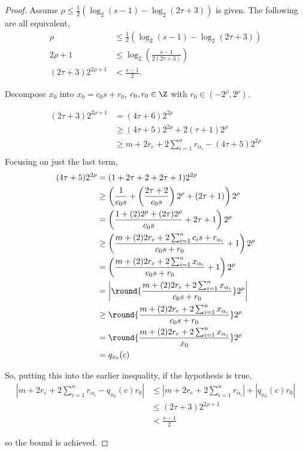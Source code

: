 \documentclass[a4paper,11pt, oneside]{article}
\begin{document}
\begin{proof}
    Assume $\rho \leq \frac{1}{2}\left( \log_2(s-1) - \log_2(2\tau+3)\right)$ is given.  
    The following are all equivalent,
\begin{align*}
    \rho &\leq \frac{1}{2}\left(\log_2(s-1) - \log_2(2\tau+3)\right)\\
    2\rho+1 &\leq \log_2 \left( \frac{s-1}{2(2\tau+3)} \right)\\
    (2\tau+3) 2^{2\rho+1} &< \frac{s-1}{2}.
\end{align*}

Decompose $x_0$ into $x_0 = c_0s+r_0$, $c_0,r_0\in\Z$ with $r_0\in (-2^\rho,2^\rho)$.

\begin{align*}
    (2\tau+3) 2^{2\rho+1} &= (4\tau + 6)2^{2\rho}\\
    &\geq (4\tau + 5)2^{2\rho} + 2(\tau+1)2^{\rho}\\
    &\geq m + 2r_e + 2\sum_{i=1}^n r_{\alpha_i} -  (4\tau + 5)2^{2\rho}\\
\end{align*}
Focusing on just the last term,
\begin{align*}
    (4\tau+5) 2^{2\rho} &= (1+2\tau + 2 + 2\tau + 1) 2^{2\rho}\\
    &\geq \left( \frac{1}{c_0s} + \left( \frac{2\tau + 2}{c_0s} \right)2^\rho + (2\tau+1) \right)2^\rho\\
    &=    \left( \frac{1+(2)2^\rho + (2\tau)2^\rho}{c_0s} + 2\tau + 1\right)2^\rho\\
    &\geq \left( \frac{m+(2)2r_e + 2\sum_{i=1}^n c_is + r_{\alpha_i}}{c_0s+r_0}+1\right)2^\rho\\
    &=    \left( \frac{m+(2)2r_e + 2\sum_{i=1}^n x_{\alpha_i}}{c_0s+r_0}+1\right)2^\rho\\
    &=    \left|\round{\frac{m+(2)2r_e + 2\sum_{i=1}^n x_{\alpha_i}}{c_0s +r_0}}2^\rho\right|\\
    &\geq \round{\frac{m+(2)2r_e + 2\sum_{i=1}^n x_{\alpha_i}}{c_0s +r_0}}2^\rho\\
    &=    \round{\frac{m+(2)2r_e + 2\sum_{i=1}^n x_{\alpha_i}}{x_0}}2^\rho\\
    &=    q_{x_0}(c)
\end{align*}

So, putting this into the earlier inequality, if the hypothesis is true,
    \begin{align*}
        \left| m + 2r_e + 2\sum_{i=1}^n r_{\alpha_i} - q_{x_0}(c)r_0\right| &\leq \left|m + 2r_e + 2\sum_{i=1}^n r_{\alpha_i}\right| +\left| q_{x_0}(c)r_0\right| \\
        &\leq (2\tau+3) 2^{2\rho+1}\\
        &< \frac{s-1}{2}
    \end{align*}

so the bound is achieved.

\end{proof}
\end{document}
